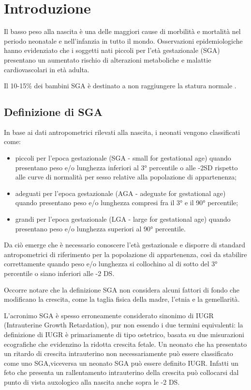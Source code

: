 \mainmatter

\chapter{Introduzione}
 
Il basso peso alla nascita \`e una delle maggiori cause di morbilit\`a e mortalit\`a
nel periodo neonatale e nell'infanzia in tutto il mondo.
Osservazioni epidemiologiche hanno evidenziato che i soggetti nati piccoli 
per l'et\`a gestazionale (SGA) presentano un aumentato rischio di 
alterazioni metaboliche e malattie cardiovascolari in età adulta\cite{consensus}.

Il 10-15\% dei bambini SGA è destinato a non raggiungere la statura normale\cite{karlberg1995growth} \cite{leger1997reduced}.

\section{Definizione di SGA}

In base ai dati antropometrici rilevati alla nascita, i neonati vengono classificati come:
\begin{itemize}
\item piccoli per l'epoca gestazionale (SGA - small for gestational age) quando presentano peso e/o lunghezza inferiori al 3°
   percentile o alle -2SD rispetto alle curve di normalità per sesso relative alla popolazione di appartenenza;
\item adeguati per l'epoca gestazionale (AGA - adeguate for gestational age) quando presentano peso e/o lunghezza compresi
   fra il 3° e il 90° percentile;
\item grandi per l'epoca gestazionale (LGA - large for gestational age) quando presentano peso e/o lunghezza superiori
   al 90° percentile\cite{sga-1}.
\end{itemize}

Da ciò emerge che è necessario conoscere l'età gestazionale e disporre di standard antropometrici di riferimento per la popolazione di appartenenza, così da stabilire correttamente quando peso e/o lunghezza si collochino al di sotto del 3° percentile o siano inferiori alle -2 DS.

 Occorre notare che la definizione SGA non considera alcuni fattori di fondo che modificano la crescita, come la taglia fisica della madre,
l'etnia e la gemellarit\`a\cite{consensus}.

L'acronimo SGA è spesso erroneamente considerato sinonimo di IUGR (Intrauterine Growth Retardation), pur non essendo i due termini
equivalenti: la definizione di IUGR è primariamente di tipo ostetrico, basata su due misurazioni ecografiche che evidenzino la ridotta crescita fetale.
Un neonato che ha presentato un ritardo di crescita intrauterino non necessariamente pu\`o essere classificato come uno SGA,viceversa un
neonato SGA pu\`o essere definito IUGR. Infatti un feto che presenta un rallentamento intrauterino della crescita può collocarsi dal punto di vista 
auxologico alla nascita anche sopra le -2 DS\cite{sga}.

